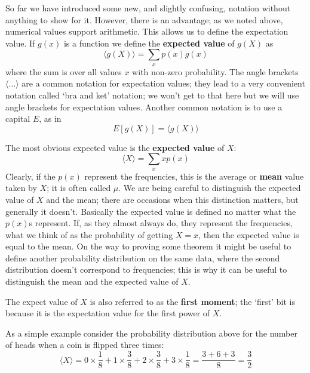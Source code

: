 \documentclass[11pt,a4paper]{scrartcl}
\begin{document}
So far we have introduced some new, and slightly confusing, notation
without anything to show for it. However, there is an advantage; as we
noted above, numerical values support arithmetic. This allows us to
define the expectation value. If $g(x)$ is a function we define the
\textbf{expected value} of $g(X)$ as
\begin{equation}
\langle g(X)\rangle = \sum_x p(x)g(x)
\end{equation}
where the sum is over all values $x$ with non-zero probability. The
angle brackets $\langle \ldots \rangle$ are a common notation for
expectation values; they lead to a very convenient notation called
\lq{}bra and ket\rq{} notation; we won't get to that here but we will
use angle brackets for expectation values. Another common notation is
to use a capital $E$, as in
\begin{equation}
E[g(X)]=\langle g(X)\rangle
\end{equation}

The most obvious expected value is the \textbf{expected value} of $X$:
\begin{equation}
\langle X \rangle =  \sum_x x p(x)
\end{equation}
Clearly, if the $p(x)$ represent the frequencies, this is the average
or \textbf{mean} value taken by $X$; it is often called $\mu$. We are
being careful to distinguish the expected value of $X$ and the mean;
there are occasions when this distinction matters, but generally it
doesn't. Basically the expected value is defined no matter what the
$p(x)$s represent. If, as they almost always do, they represent the
frequencies, what we think of as the probability of getting $X=x$,
then the expected value is equal to the mean. On the way to proving
some theorem it might be useful to define another probability
distribution on the same data, where the second distribution doesn't
correspond to frequencies; this is why it can be useful to distinguish
the mean and the expected value of $X$.

The expect value of $X$ is also referred to as the \textbf{first
  moment}; the \lq{}first\rq{} bit is because it is the expectation
value for the first power of $X$.

As a simple example consider the probability distribution above for
the number of heads when a coin is flipped three times:
\begin{equation}
\langle X\rangle =0\times\frac{1}{8}+1\times\frac{3}{8}+2\times\frac{3}{8}+3\times \frac{1}{8}=\frac{3+6+3}{8}=\frac{3}{2}
\end{equation}
\end{document}
